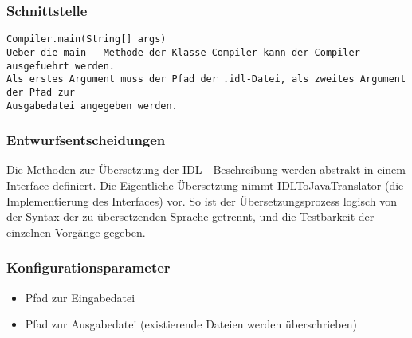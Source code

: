 \documentclass{article}
\begin{document}
\subsubsection{Schnittstelle}
\begin{lstlisting}
Compiler.main(String[] args)
Ueber die main - Methode der Klasse Compiler kann der Compiler ausgefuehrt werden.
Als erstes Argument muss der Pfad der .idl-Datei, als zweites Argument der Pfad zur 
Ausgabedatei angegeben werden.
\end{lstlisting}

\subsubsection{Entwurfsentscheidungen}
Die Methoden zur Übersetzung der IDL - Beschreibung werden abstrakt in einem Interface 
definiert. Die Eigentliche Übersetzung nimmt IDLToJavaTranslator (die Implementierung des 
Interfaces) vor. So ist der Übersetzungsprozess logisch von der Syntax der zu übersetzenden
Sprache getrennt, und die Testbarkeit der einzelnen Vorgänge gegeben.
\subsubsection{Konfigurationsparameter}

\begin{itemize}
    \item Pfad zur Eingabedatei
    \item Pfad zur Ausgabedatei (existierende Dateien werden überschrieben)    
\end{itemize}
\end{document}
